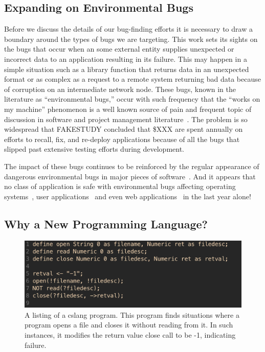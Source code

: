 \subsection{Expanding on Environmental Bugs}

Before we discuss the details of our bug-finding efforts it is necessary to
draw a boundary around the types of bugs we are targeting.
This work sets its sights on the bugs that occur when an some external
entity supplies unexpected or incorrect data to an
application resulting in its failure.
This may happen in a simple situation such as a library function that
returns data in an unexpected format or as complex as a request to a remote
system returning bad data because of corruption on an intermediate network
node.
These bugs, known in the literature as ``environmental bugs,'' occur with
such frequency
that the ``works on my machine'' phenomenon is a well known
source of pain
and frequent topic of discussion
in software and project management
literature~\cite{notreal}.
The problem is so widespread
that FAKESTUDY concluded
that \$XXX are spent annually on efforts to
recall,
fix,
and re-deploy applications
because of all the bugs
that slipped past extensive testing efforts
during development.

The impact of these bugs continues to be reinforced by the regular
appearance of dangerous environmental bugs in major pieces of
software~\cite{devzeroroot}.  And it appears that no class of application
is safe with environmental bugs affecting operating systems~\cite{bad},
user applications~\cite{bad} and even web applications~\cite{bad} in the
last year alone!





\subsection{Why a New Programming Language?}
\begin{figure}
  \includegraphics[scale=.50, frame]{images/cslanglisting}
  \caption{A listing of a cslang program.  This program finds situations
  where a program opens a file and closes it without reading from it.  In
  such instances, it modifies the return value close call to be -1,
  indicating failure.}
  \label{fig:cslanglisting}
\end{figure}


